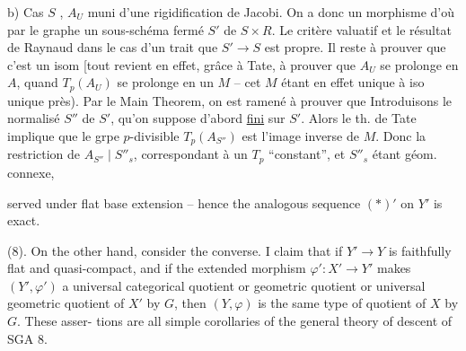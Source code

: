 b) Cas $S$  , $A_U$ muni d'une rigidification de Jacobi. On a donc un morphisme
\margin{\deleted{$\unsure{\ell}$}}
d'où par le  graphe un sous-schéma fermé $S'$ de $S\times R$. Le critère valuatif et le résultat de Raynaud dans le cas d'un trait  que $S'\to S$ est propre. Il reste à prouver que c'est un isom [tout revient en effet, grâce à Tate, à prouver que $A_U$ se prolonge en $A$, quand $T_p(A_U)$ se prolonge en un $M$ -- cet $M$ étant en effet unique à iso unique près). Par le Main Theorem, on est ramené à prouver que   Introduisons le normalisé $S''$ de $S'$, qu'on suppose d'abord \uline{fini} sur $S'$. Alors le th. de Tate implique que le grpe $p$-divisible $T_p(A_{S''})$  est l'image inverse de  $M$. Donc la restriction de $A_{S''}\mid S''_s$, correspondant à un $T_p$ ``constant'', et $S''_s$ étant géom. connexe,

served under flat base extension -- hence the analogous sequence $(*)'$ on $Y'$ is exact.

(8). On the other hand, consider the converse. I claim that if $Y'\longrightarrow Y$ is faithfully flat and quasi-compact, and if the extended morphism $\varphi':X'\longrightarrow Y'$ makes $(Y',\varphi')$ a universal categorical quotient or geometric quotient or universal geometric quotient of $X'$ by $G$, then $(Y,\varphi)$ is the same type of quotient of $X$ by $G$. These asser-
tions are all simple corollaries of the general theory of descent of SGA 8.

